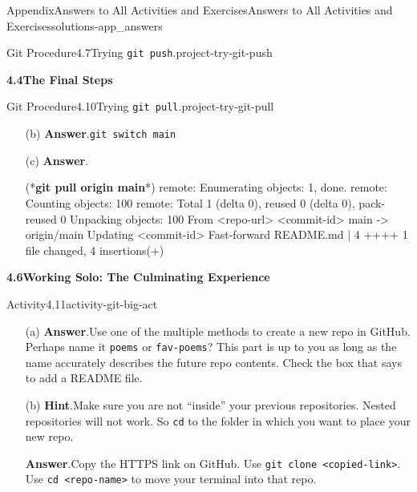 \documentclass[oneside,10pt,]{book}
\newcommand{\blocktitlefont}{\relax}
\newcommand{\mono}[1]{\texttt{#1}}
\newcommand{\consoleinput}[1]{\textbf{#1}}
\begin{document}
\begin{solutions-chapter}{Appendix}{Answers to All Activities and Exercises}{}{Answers to All Activities and Exercises}{}{}{solutions-app_answers}
\begin{projectsolution}{Git Procedure}{4.7}{Trying \mono{git push}.}{project-try-git-push}
\begin{enumerate}[font=\bfseries,label=(\alph*),ref=\alph*]
\end{enumerate}%
\end{projectsolution}%
\par\medskip
\noindent\textbf{\Large{}4.4\space\textperiodcentered\space{}The Final Steps}
\begin{projectsolution}{Git Procedure}{4.10}{Trying \mono{git pull}.}{project-try-git-pull}%
\begin{enumerate}[font=\bfseries,label=(\alph*),ref=\alph*]%
\item[(b)]\noindent\textbf{\blocktitlefont Answer}.\hypertarget{answer-try-git-pull-f-b-back}{}\quad{}\mono{git switch main}%
\item[(c)]\noindent\textbf{\blocktitlefont Answer}.\hypertarget{answer-try-git-pull-g-b-back}{}\quad{}\begin{console}{0}{1}{0}
(*\consoleinput{git pull origin main}*)
remote: Enumerating objects: 1, done.
remote: Counting objects: 100%
remote: Total 1 (delta 0), reused 0 (delta 0), pack-reused 0
Unpacking objects: 100%
From <repo-url>
   <commit-id>  main       -> origin/main
Updating <commit-id>
Fast-forward
 README.md | 4 ++++
 1 file changed, 4 insertions(+)
\end{console}
\end{enumerate}%
\end{projectsolution}%
\par\medskip
\noindent\textbf{\Large{}4.6\space\textperiodcentered\space{}Working Solo: The Culminating Experience}
\begin{activitysolution}{Activity}{4.11}{}{activity-git-big-act}%
\begin{enumerate}[font=\bfseries,label=(\alph*),ref=\alph*]%
\item[(a)]\noindent\textbf{\blocktitlefont Answer}.\hypertarget{answer-git-ba-newrepo-b-back}{}\quad{}Use one of the multiple methods to create a new repo in GitHub. Perhaps name it \mono{poems} or \mono{fav-poems}? This part is up to you as long as the name accurately describes the future repo contents. Check the box that says to add a README file.%
\item[(b)]\noindent\textbf{\blocktitlefont Hint}.\hypertarget{hint-git-ba-clone-b-back}{}\quad{}Make sure you are not ``inside'' your previous repositories. Nested repositories will not work. So \mono{cd} to the folder in which you want to place your new repo.%
\par\smallskip%
\noindent\textbf{\blocktitlefont Answer}.\hypertarget{answer-git-ba-clone-c-back}{}\quad{}Copy the HTTPS link on GitHub. Use \mono{git clone <copied-link>}. Use \mono{cd <repo-name>} to move your terminal into that repo.%

\end{enumerate}
\end{activitysolution}
\end{solutions-chapter}
\end{document}
